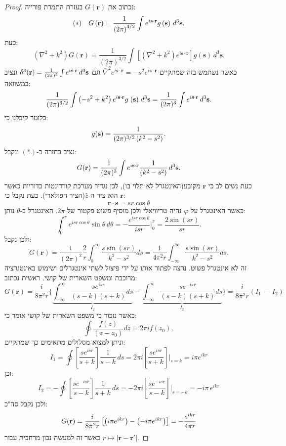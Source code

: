 \documentclass{tstextbook}
\begin{document}
\begin{proof}
נכתוב את \(G\left( \mathbf{r} \right)\) בעזרת התמרת פורייה:
$$(*)\quad G\left( {\bf r} \right)=\frac{1}{\left(2\pi\right)^{3/2}}\int e^{i{\bf s\cdot r}}g\left( {\bf s} \right)\,d^{3}{\bf s}.$$
כעת:
$$\left(\nabla^{2}+k^{2}\right)G(\mathbf{r})={\frac{1}{(2\pi)^{3/2}}}\int\left[\left(\nabla^{2}+k^{2}\right)e^{i\mathbf{s}\cdot\mathbf{r}}\right]g(\mathbf{s})\,d^{3}\mathbf{s}.$$
כאשר נשתמש בזה שמתקיים \(\bar{\nabla}^2e^{ i\mathbf{s}\cdot \mathbf{r} }=-s ^{2}e^{ i\mathbf{s}\cdot \mathbf{r} }\) וגם \(\delta^{3}({\bf r})=\frac{1}{(2\pi)^{3}}\int e^{i{\bf s\cdot r}}\,d^{3}{\bf s}\) ונציב במשוואה:
$${\frac{1}{(2\pi)^{3/2}}}\int\left(-s^{2}+k^{2}\right)e^{i{\bf s\cdot r}}g\;({\bf s})\;d^{3}{\bf s}={\frac{1}{(2\pi)^{3}}}\int e^{i{\bf s\cdot r}}\,d^{3}{\bf s}.$$
כלומר קיבלנו כי:
$$g({\bf s})=\frac{1}{(2\pi)^{3/2}\left(k^{2}-s^{2}\right)}.$$
נציב בחזרה ב-\((*)\) ונקבל:
$$G({\bf r})=\frac{1}{(2\pi)^{3}}\int e^{i{\bf s\cdot r}}\frac{1}{\left(k^{2}-s^{2}\right)}\,d^{3}{\bf s}.$$
כעת נשים לב כי \(\mathbf{r}\) מקובע(האינטגרל לא תלוי בו), לכן נגדיר מערכת קורדינטות כדוריות כאשר \(\mathbf{r}\) הוא ציר ה-\(\hat{z}\)(הציר הפולארי). כעת נקבל כי:
$$\mathbf{r}\cdot \mathbf{s}=s r\cos \theta$$
כאשר האינטגרל על \(\varphi\) נהיה טריוויאלי ולכן מוסיף פשוט פקטור של \(2\pi\). האינטגרל ב-\(\theta\) נותן:
$$\int_{0}^{\pi}e^{i s r\cos\theta}\sin\theta\,d\theta=-\frac{e^{i s r\cos\theta}}{i s r}\bigg|_{0}^{\pi}=\frac{2\sin(s r)}{s r}.$$
ולכן נקבל:
$$G(\mathbf{r})={\frac{1}{(2\pi)^{2}}}{\frac{2}{r}}\int_{0}^{\infty}{\frac{s\sin(s r)}{k^{2}-s^{2}}}d s={\frac{1}{4\pi^{2}r}}\int_{-\infty}^{\infty}{\frac{s\sin(s r)}{k^{2}-s^{2}}}d s.$$
זה לא אינטגרל פשוט. נרצה לפתור אותו על ידי פיצול לשתי אינטגרלים ושימוש באינטגרציה מרוכבת ומשפט השארית של קושי. ראשית נכתוב:
$$G(\mathbf{r})={\frac{i}{8\pi^{2}r}}\bigg\{\underbrace{ \int_{-\infty}^{\infty}{\frac{s e^{i s r}}{\left(s-k\right)\left(s+k\right)}}d s }_{ I_{2} }-\underbrace{ \int_{-\infty}^{\infty}{\frac{s e^{-i s r}}{\left(s-k\right)\left(s+k\right)}}d s }_{ I_{2} }\bigg\}=\frac{i}{8\pi^{2}r}\left(I_{1}\,-\,I_{2}\right)$$
כאשר נזכור כי משפט השארית של קושי אומר כי:
$$\oint\frac{f(z)}{(z-z_{0})}d z=2\pi i f(z_{0}),$$
וניתן למצוא מסלולים מתאימים כך שמתקיים:
$$I_{1}=\oint\left[\frac{s e^{i s r}}{s+k}\right]\frac{1}{s-k}\,d s=2\pi i\left[\frac{s e^{i s r}}{s+k}\right]\biggr\vert_{s=k}=i\pi e^{i k r}$$
וכן:
$$I_{2}=-\oint\left[\frac{s e^{-i s r}}{s-k}\right]\frac{1}{s+k}\,d s=-2\pi i\left[\frac{s e^{-i s r}}{s-k}\right]\biggr|_{s=-k}=-i\pi\,e^{i k r}$$
ולכן נקבל סה"כ:
$$G({\bf r})=\frac{i}{8\pi^{2}r}\left[\left(i\pi e^{i k r}\right)-\left(-i\pi e^{i k r}\right)\right]=-\frac{e^{i k r}}{4\pi r}$$
כאשר זה למעשה נכון מרחבית עבור \(r \mapsto |\mathbf{r}-\mathbf{r'}|\).

\end{proof}
\end{document}
